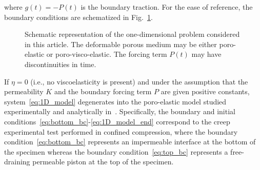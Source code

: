 \documentclass[12pt,a4paper]{amsart}
\theoremstyle{definition}
\begin{document}
where $g(t) = -P(t)$ is the boundary traction. For the ease of reference, the boundary conditions are schematized in Fig.~\ref{fig:1D_model}.
\begin{figure}[h!]
\begin{center}
\end{center}
\caption{Schematic representation of the one-dimensional problem considered in this article. The deformable porous medium may be either poro-elastic or poro-visco-elastic. The forcing term $P(t)$ may have discontinuities in time.}
\label{fig:1D_model}
\end{figure}

If $\eta =0$ (i.e., no viscoelasticity is present) and under the assumption
that the permeability $K$ and the boundary forcing term $P$ are given positive constants, system~\eqref{eq:1D_model}
degenerates into the poro-elastic model studied experimentally and
analytically in~\cite{Soltz1998}. Specifically, the boundary and initial
conditions~\eqref{eq:bottom_bc}-\eqref{eq:1D_model_end} correspond to the
creep experimental test performed in confined compression, where the boundary condition~\eqref{eq:bottom_bc}
represents an impermeable interface at the bottom of the specimen whereas
the boundary condition~\eqref{eq:top_bc} represents a free-draining permeable piston
at the top of the specimen.
\end{document}
